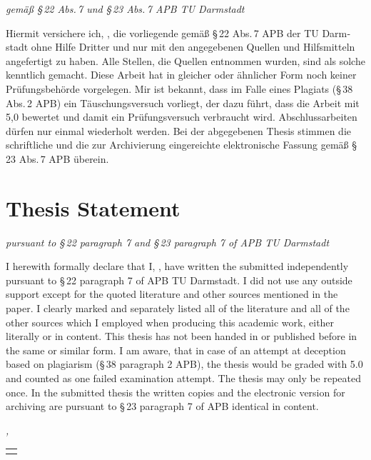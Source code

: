 


\begingroup

\begin{otherlanguage}{ngerman}
\begin{flushright}
	\emph{gemäß §\,22 Abs.\,7 und §\,23 Abs.\,7 APB TU Darmstadt}
\end{flushright}
Hiermit versichere ich, \myName{}, die vorliegende \myDegree{} gemäß §\,22 Abs.\,7 APB der TU Darmstadt ohne Hilfe Dritter und nur mit den angegebenen Quellen und Hilfsmitteln angefertigt zu haben. Alle Stellen, die Quellen entnommen wurden, sind als solche kenntlich gemacht. Diese Arbeit hat in gleicher oder ähnlicher Form noch keiner Prüfungsbehörde vorgelegen.
Mir ist bekannt, dass im Falle eines Plagiats (§\,38 Abs.\,2 APB) ein Täuschungsversuch vorliegt, der dazu führt, dass die Arbeit mit 5,0 bewertet und damit ein Prüfungsversuch verbraucht wird. Abschlussarbeiten dürfen nur einmal wiederholt werden.
Bei der abgegebenen Thesis stimmen die schriftliche und die zur Archivierung eingereichte elektronische Fassung gemäß §\,23 Abs.\,7 APB überein.
\end{otherlanguage}

\vfill

\let\cleardoublepage\relax
\chapter*{Thesis Statement}
\begin{flushright}
	\emph{pursuant to §\,22 paragraph 7 and §\,23 paragraph 7 of APB TU Darmstadt}
\end{flushright}

I herewith formally declare that I, \myName{}, have written the submitted \myDegree{} independently pursuant to §\,22 paragraph 7 of APB TU Darmstadt. I did not use any outside support except for the quoted literature and other sources mentioned in the paper. I clearly marked and separately listed all of the literature and all of the other sources which I employed when producing this academic work, either literally or in content. This thesis has not been handed in or published before in the same or similar form.
I am aware, that in case of an attempt at deception based on plagiarism (§\,38 paragraph 2 APB), the thesis would be graded with 5.0 and counted as one failed examination attempt. The thesis may only be repeated once.
In the submitted thesis the written copies and the electronic version for archiving are pursuant to §\,23 paragraph 7 of APB identical in content.

\vfill

\noindent\textit{\myLocation{}, \myTime{}}

\begin{flushright}
    \begin{tabular}{m{5cm}}
        \\ \hline
        \centering\myName{} \\
    \end{tabular}
\end{flushright}

\endgroup
